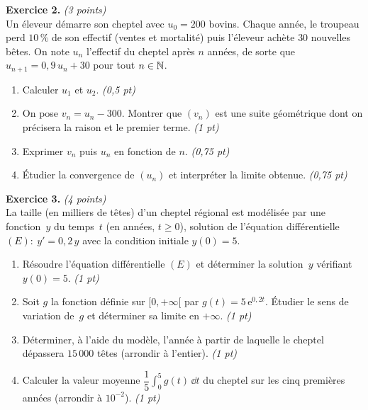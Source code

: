 \smallskip
\noindent\textbf{Exercice 2.} \hfill\textit{(3 points)}\\
Un éleveur démarre son cheptel avec $u_0=200$ bovins. Chaque année, le troupeau perd
$10\,\%$ de son effectif (ventes et mortalité) puis l'éleveur achète $30$ nouvelles
bêtes. On note $u_n$ l'effectif du cheptel après $n$ années, de sorte que
$u_{n+1}=0{,}9\,u_n+30$ pour tout $n\in\mathbb{N}$.
\begin{enumerate}[label=\arabic*)]
\item Calculer $u_1$ et $u_2$. \hfill\textit{(0,5 pt)}
\item On pose $v_n=u_n-300$. Montrer que $(v_n)$ est une suite géométrique dont on
précisera la raison et le premier terme. \hfill\textit{(1 pt)}
\item Exprimer $v_n$ puis $u_n$ en fonction de $n$. \hfill\textit{(0,75 pt)}
\item Étudier la convergence de $(u_n)$ et interpréter la limite obtenue. \hfill\textit{(0,75 pt)}
\end{enumerate}

\smallskip
\noindent\textbf{Exercice 3.} \hfill\textit{(4 points)}\\
La taille (en milliers de têtes) d'un cheptel régional est modélisée par une fonction~$y$
du temps~$t$ (en années, $t\ge 0$), solution de l'équation différentielle
$(E):\ y'=0{,}2\,y$ avec la condition initiale $y(0)=5$.
\begin{enumerate}[label=\arabic*)]
\item Résoudre l'équation différentielle $(E)$ et déterminer la solution~$y$ vérifiant
$y(0)=5$. \hfill\textit{(1 pt)}
\item Soit $g$ la fonction définie sur $[0,+\infty[$ par $g(t)=5\,\mathrm{e}^{0{,}2t}$.
Étudier le sens de variation de~$g$ et déterminer sa limite en $+\infty$. \hfill\textit{(1 pt)}
\item Déterminer, à l'aide du modèle, l'année à partir de laquelle le cheptel dépassera
$15\,000$ têtes (arrondir à l'entier). \hfill\textit{(1 pt)}
\item Calculer la valeur moyenne $\dfrac{1}{5}\displaystyle\int_0^{5} g(t)\,\dd t$ du
cheptel sur les cinq premières années (arrondir à $10^{-2}$). \hfill\textit{(1 pt)}
\end{enumerate}

